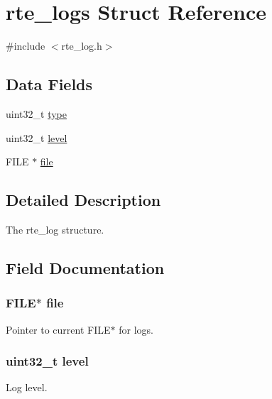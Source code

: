 \hypertarget{structrte__logs}{}\section{rte\+\_\+logs Struct Reference}
\label{structrte__logs}


{\ttfamily \#include $<$rte\+\_\+log.\+h$>$}

\subsection*{Data Fields}
\begin{DoxyCompactItemize}
\item 
uint32\+\_\+t \hyperlink{structrte__logs_ad44b615021ed3ccb734fcaf583ef4a03}{type}
\item 
uint32\+\_\+t \hyperlink{structrte__logs_a6a330c3b2adf87bfa27e9a9450d8bc40}{level}
\item 
F\+I\+L\+E $\ast$ \hyperlink{structrte__logs_a702945180aa732857b380a007a7e2a21}{file}
\end{DoxyCompactItemize}


\subsection{Detailed Description}
The rte\+\_\+log structure. 

\subsection{Field Documentation}
\hypertarget{structrte__logs_a702945180aa732857b380a007a7e2a21}{}
\subsubsection[{file}]{\setlength{\rightskip}{0pt plus 5cm}F\+I\+L\+E$\ast$ file}\label{structrte__logs_a702945180aa732857b380a007a7e2a21}
Pointer to current F\+I\+L\+E$\ast$ for logs. \hypertarget{structrte__logs_a6a330c3b2adf87bfa27e9a9450d8bc40}{}
\subsubsection[{level}]{\setlength{\rightskip}{0pt plus 5cm}uint32\+\_\+t level}\label{structrte__logs_a6a330c3b2adf87bfa27e9a9450d8bc40}
Log level. \hypertarget{structrte__logs_ad44b615021ed3ccb734fcaf583ef4a03}{}
